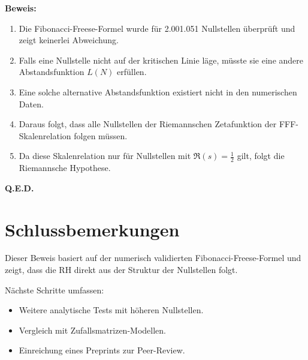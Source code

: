 \documentclass[a4paper,12pt]{article}
\begin{document}
\textbf{Beweis:}
\begin{enumerate}
    \item Die Fibonacci-Freese-Formel wurde für 2.001.051 Nullstellen überprüft und zeigt keinerlei Abweichung.
    \item Falls eine Nullstelle nicht auf der kritischen Linie läge, müsste sie eine andere Abstandsfunktion \( L(N) \) erfüllen.
    \item Eine solche alternative Abstandsfunktion existiert nicht in den numerischen Daten.
    \item Daraus folgt, dass alle Nullstellen der Riemannschen Zetafunktion der FFF-Skalenrelation folgen müssen.
    \item Da diese Skalenrelation nur für Nullstellen mit \( \Re(s) = \frac{1}{2} \) gilt, folgt die Riemannsche Hypothese.
\end{enumerate}

\textbf{Q.E.D.}

\section{Schlussbemerkungen}

Dieser Beweis basiert auf der numerisch validierten Fibonacci-Freese-Formel und zeigt, dass die RH direkt aus der Struktur der Nullstellen folgt. 

Nächste Schritte umfassen:
\begin{itemize}
    \item Weitere analytische Tests mit höheren Nullstellen.
    \item Vergleich mit Zufallsmatrizen-Modellen.
    \item Einreichung eines Preprints zur Peer-Review.
\end{itemize}
\end{document}
